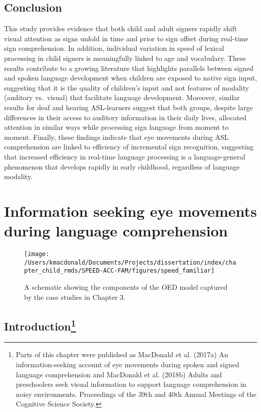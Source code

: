 \documentclass[oneside]{report}
\begin{document}
\hypertarget{conclusion}{%
\section{Conclusion}\label{conclusion}}

This study provides evidence that both child and adult signers rapidly
shift visual attention as signs unfold in time and prior to sign offset
during real-time sign comprehension. In addition, individual variation
in speed of lexical processing in child signers is meaningfully linked
to age and vocabulary. These results contribute to a growing literature
that highlights parallels between signed and spoken language development
when children are exposed to native sign input, suggesting that it is
the quality of children's input and not features of modality (auditory
vs.~visual) that facilitate language development. Moreover, similar
results for deaf and hearing ASL-learners suggest that both groups,
despite large differences in their access to auditory information in
their daily lives, allocated attention in similar ways while processing
sign language from moment to moment. Finally, these findings indicate
that eye movements during ASL comprehension are linked to efficiency of
incremental sign recognition, suggesting that increased efficiency in
real-time language processing is a language-general phenomenon that
develops rapidly in early childhood, regardless of language modality.

\hypertarget{speed-fam}{%
\chapter{Information seeking eye movements during language
comprehension}\label{speed-fam}}
\begin{figure}[t]

{\centering \texttt{[image: /Users/kmacdonald/Documents/Projects/dissertation/index/chapter\_child\_rmds/SPEED-ACC-FAM/figures/speed\_familiar]} 

}

\caption{A schematic showing the components of the OED model captured by the case studies in Chapter 3.}\label{fig:schematic-speed-fam}
\end{figure}
\hypertarget{introduction-2}{%
\section[Introduction]{\texorpdfstring{Introduction\footnote{Parts of
  this chapter were published as MacDonald et al. (2017a) An
  information-seeking account of eye movements during spoken and signed
  language comprehension and MacDonald et al. (2018b) Adults and
  preschoolers seek visual information to support language comprehension
  in noisy environments. Proceedings of the 39th and 40th Annual
  Meetings of the Cognitive Science Society.}}{Introduction}}\label{introduction-2}}
\end{document}
